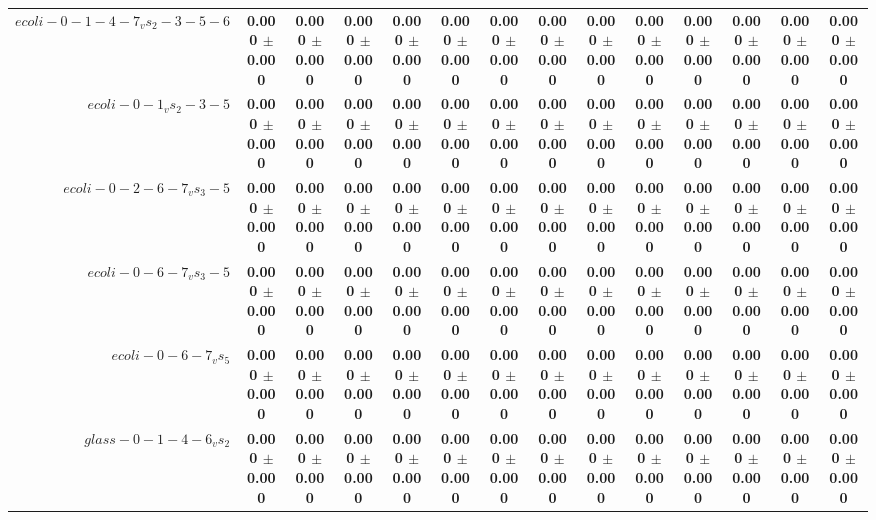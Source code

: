 \begin{table}[!ht]
{\begin{tabular}{r c c c c c c c c c c c c c}
$ecoli-0-1-4-7_vs_2-3-5-6$ & \textbf{0.000 $\pm$ 0.000} & \textbf{0.000 $\pm$ 0.000} & \textbf{0.000 $\pm$ 0.000} & \textbf{0.000 $\pm$ 0.000} & \textbf{0.000 $\pm$ 0.000} & \textbf{0.000 $\pm$ 0.000} & \textbf{0.000 $\pm$ 0.000} & \textbf{0.000 $\pm$ 0.000} & \textbf{0.000 $\pm$ 0.000} & \textbf{0.000 $\pm$ 0.000} & \textbf{0.000 $\pm$ 0.000} & \textbf{0.000 $\pm$ 0.000} & \textbf{0.000 $\pm$ 0.000} \\
$ecoli-0-1_vs_2-3-5$ & \textbf{0.000 $\pm$ 0.000} & \textbf{0.000 $\pm$ 0.000} & \textbf{0.000 $\pm$ 0.000} & \textbf{0.000 $\pm$ 0.000} & \textbf{0.000 $\pm$ 0.000} & \textbf{0.000 $\pm$ 0.000} & \textbf{0.000 $\pm$ 0.000} & \textbf{0.000 $\pm$ 0.000} & \textbf{0.000 $\pm$ 0.000} & \textbf{0.000 $\pm$ 0.000} & \textbf{0.000 $\pm$ 0.000} & \textbf{0.000 $\pm$ 0.000} & \textbf{0.000 $\pm$ 0.000} \\
$ecoli-0-2-6-7_vs_3-5$ & \textbf{0.000 $\pm$ 0.000} & \textbf{0.000 $\pm$ 0.000} & \textbf{0.000 $\pm$ 0.000} & \textbf{0.000 $\pm$ 0.000} & \textbf{0.000 $\pm$ 0.000} & \textbf{0.000 $\pm$ 0.000} & \textbf{0.000 $\pm$ 0.000} & \textbf{0.000 $\pm$ 0.000} & \textbf{0.000 $\pm$ 0.000} & \textbf{0.000 $\pm$ 0.000} & \textbf{0.000 $\pm$ 0.000} & \textbf{0.000 $\pm$ 0.000} & \textbf{0.000 $\pm$ 0.000} \\
$ecoli-0-6-7_vs_3-5$ & \textbf{0.000 $\pm$ 0.000} & \textbf{0.000 $\pm$ 0.000} & \textbf{0.000 $\pm$ 0.000} & \textbf{0.000 $\pm$ 0.000} & \textbf{0.000 $\pm$ 0.000} & \textbf{0.000 $\pm$ 0.000} & \textbf{0.000 $\pm$ 0.000} & \textbf{0.000 $\pm$ 0.000} & \textbf{0.000 $\pm$ 0.000} & \textbf{0.000 $\pm$ 0.000} & \textbf{0.000 $\pm$ 0.000} & \textbf{0.000 $\pm$ 0.000} & \textbf{0.000 $\pm$ 0.000} \\
$ecoli-0-6-7_vs_5$ & \textbf{0.000 $\pm$ 0.000} & \textbf{0.000 $\pm$ 0.000} & \textbf{0.000 $\pm$ 0.000} & \textbf{0.000 $\pm$ 0.000} & \textbf{0.000 $\pm$ 0.000} & \textbf{0.000 $\pm$ 0.000} & \textbf{0.000 $\pm$ 0.000} & \textbf{0.000 $\pm$ 0.000} & \textbf{0.000 $\pm$ 0.000} & \textbf{0.000 $\pm$ 0.000} & \textbf{0.000 $\pm$ 0.000} & \textbf{0.000 $\pm$ 0.000} & \textbf{0.000 $\pm$ 0.000} \\
$glass-0-1-4-6_vs_2$ & \textbf{0.000 $\pm$ 0.000} & \textbf{0.000 $\pm$ 0.000} & \textbf{0.000 $\pm$ 0.000} & \textbf{0.000 $\pm$ 0.000} & \textbf{0.000 $\pm$ 0.000} & \textbf{0.000 $\pm$ 0.000} & \textbf{0.000 $\pm$ 0.000} & \textbf{0.000 $\pm$ 0.000} & \textbf{0.000 $\pm$ 0.000} & \textbf{0.000 $\pm$ 0.000} & \textbf{0.000 $\pm$ 0.000} & \textbf{0.000 $\pm$ 0.000} & \textbf{0.000 $\pm$ 0.000} \\

\end{tabular}}
\end{table}
